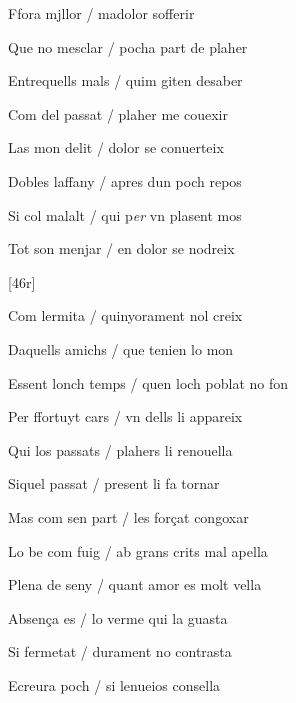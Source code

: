 \begin{estrofa}

 Ffora mjllor / madolor sofferir

 Que no mesclar / pocha part de plaher

 Entrequells mals / quim 
 giten desaber

 Com del passat / plaher  me couexir

 Las mon delit / dolor se conuerteix

 Dobles laffany / apres dun poch repos

 Si col malalt / qui p\textit{er} vn plasent mos

 Tot son menjar / en dolor se nodreix

\end{estrofa}


[46r]
\begin{estrofa}

 Com lermita / quinyorament nol creix

 Daquells amichs / que tenien lo mon

 Essent lonch temps / quen loch poblat no fon

 Per ffortuyt cars / vn dells li appareix

 Qui los passats / plahers li renouella

 Siquel passat / present li fa tornar

 Mas com sen part / les for\c{c}at congoxar

 Lo be com fuig / ab grans crits mal apella

\end{estrofa}



\begin{tornada}

 Plena de seny / quant amor es molt vella

 Absen\c{c}a es /  lo verme qui la guasta

 Si fermetat / durament no contrasta

 Ecreura poch / si lenueios consella

\end{tornada}





